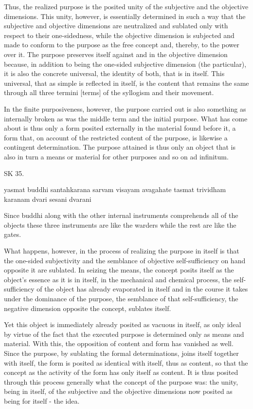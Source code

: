 Thus, the realized purpose is the posited unity of
the subjective and the objective dimensions.
This unity, however, is essentially determined in such a way that
the subjective and objective dimensions are neutralized
and sublated only with respect to their one-sidedness,
while the objective dimension is subjected and made to conform
to the purpose as the free concept and, thereby, to the power over it.
The purpose preserves itself against and in the objective dimension
because, in addition to being the one-sided subjective dimension (the particular),
it is also the concrete universal, the identity of both, that is in itself.
This universal, that as simple is reflected in itself, is the content that
remains the same through all three termini [terms] of the syllogism and their movement.

In the finite purposiveness, however, the purpose carried out is also
something as internally broken as was the middle term and the initial purpose.
What has come about is thus only a form posited externally in the material
found before it, a form that, on account of the restricted content of
the purpose, is likewise a contingent determination.
The purpose attained is thus only an object that is also
in turn a means or material for other purposes and so on ad infinitum.

SK 35.

yasmat buddhi santahkarana sarvam visayam avagahate
tasmat trividham karanam dvari sesani dvarani

Since buddhi along with the other internal instruments
comprehends all of the objects these three instruments are
like the warders while the rest are like the gates.

What happens, however, in the process of realizing
the purpose in itself is that the one-sided subjectivity and
the semblance of objective self-sufficiency on hand opposite it are sublated.
In seizing the means, the concept posits itself as the object's essence as
it is in itself, in the mechanical and chemical process,
the self-sufficiency of the object has already evaporated in itself and
in the course it takes under the dominance of the purpose,
the semblance of that self-sufficiency,
the negative dimension opposite the concept, sublates itself.

Yet this object is immediately already posited as vacuous in itself,
as only ideal by virtue of the fact that the executed purpose is
determined only as means and material.
With this, the opposition of content and form has vanished as well.
Since the purpose, by sublating the formal determinations,
joins itself together with itself,
the form is posited as identical with itself, thus as content,
so that the concept as the activity of the form has only itself as content.
It is thus posited through this process generally what the concept of the purpose was:
the unity, being in itself, of the subjective and the objective dimensions
now posited as being for itself - the idea.


